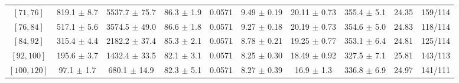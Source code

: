 \begin{tabular}{c||c|c|c|c|c|c|c||c|c}
$[71, 76]$ & 819.1 $\pm$ 8.7 & 5537.7 $\pm$ 75.7 & 86.3 $\pm$ 1.9 & 0.0571 & 9.49 $\pm$ 0.19 & 20.11 $\pm$ 0.73 & 355.4 $\pm$ 5.1 & 24.35 & 159/114\\
$[76, 84]$ & 517.1 $\pm$ 5.6 & 3574.5 $\pm$ 49.0 & 86.6 $\pm$ 1.8 & 0.0571 & 9.27 $\pm$ 0.18 & 20.19 $\pm$ 0.73 & 354.6 $\pm$ 5.0 & 24.83 & 118/114\\
$[84, 92]$ & 315.4 $\pm$ 4.4 & 2182.2 $\pm$ 37.4 & 85.3 $\pm$ 2.1 & 0.0571 & 8.78 $\pm$ 0.21 & 19.25 $\pm$ 0.77 & 353.1 $\pm$ 6.4 & 24.81 & 125/114\\
$[92, 100]$ & 195.6 $\pm$ 3.7 & 1432.4 $\pm$ 33.5 & 82.1 $\pm$ 3.1 & 0.0571 & 8.25 $\pm$ 0.30 & 18.49 $\pm$ 0.92 & 327.5 $\pm$ 7.1 & 25.81 & 143/113\\
$[100, 120]$ & 97.1 $\pm$ 1.7 & 680.1 $\pm$ 14.9 & 82.3 $\pm$ 5.1 & 0.0571 & 8.27 $\pm$ 0.39 & 16.9 $\pm$ 1.3 & 336.8 $\pm$ 6.9 & 24.97 & 141/111\\
\end{tabular}

